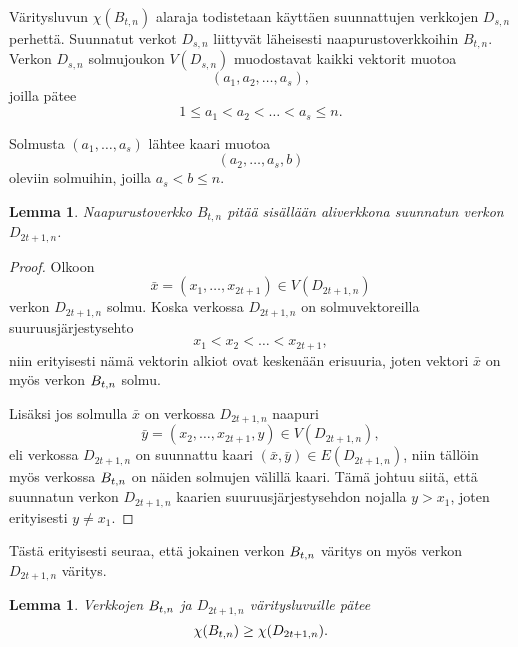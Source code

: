 \documentclass[finnish]{tktltiki2}
\newtheorem{lem}[lau]{Lemma}
\theoremstyle{definition}
\theoremstyle{remark}
\newcommand{\Dsn}{D_{s,n}}
\begin{document}
Väritysluvun $\chi(B_{t,n})$ alaraja todistetaan käyttäen suunnattujen
verkkojen $\Dsn$ perhettä. Suunnatut verkot $\Dsn$ liittyvät läheisesti
naapurustoverkkoihin $B_{t,n}$. Verkon $\Dsn$ solmujoukon $V(\Dsn)$ muodostavat
kaikki vektorit muotoa
%
\begin{equation*}
    (a_1,a_2,\dots,a_s),
\end{equation*}
%
joilla pätee
%
\begin{equation*}
    1 \leq a_1 < a_2 < \dots < a_s \leq n.
\end{equation*}

Solmusta $(a_1,\dots,a_s)$ lähtee kaari muotoa
%
\begin{equation*}
    (a_2,\dots,a_s,b)
\end{equation*}
%
oleviin solmuihin, joilla $a_s < b \leq n$.

\begin{lem}
    Naapurustoverkko $B_{t,n}$ pitää sisällään aliverkkona suunnatun verkon
    $D_{2t+1,n}$.
\end{lem}

\newcommand{\D}{D_{2t+1,n}}
\begin{proof}
    Olkoon
    \begin{equation*}
        \bar{x} = (x_1, \dots, x_{2t+1}) \in V(\D)
    \end{equation*}
    verkon $\D$ solmu.  Koska verkossa $\D$ on solmuvektoreilla
    suuruusjärjestysehto
    \begin{equation*}
        x_1 < x_2 < \dots < x_{2t+1},
    \end{equation*}
    niin erityisesti nämä vektorin alkiot ovat keskenään erisuuria, joten
    vektori $\bar{x}$ on myös verkon $B_{t,n}$ solmu.

    Lisäksi jos solmulla $\bar{x}$ on verkossa $\D$ naapuri
    \begin{equation*}
            \bar{y} = (x_2, \dots, x_{2t+1}, y) \in V(\D),
    \end{equation*}
    eli verkossa $\D$ on suunnattu kaari $(\bar{x},\bar{y}) \in E(\D)$, niin
    tällöin myös verkossa $B_{t,n}$ on näiden solmujen välillä kaari. Tämä
    johtuu siitä, että suunnatun verkon $\D$ kaarien suuruusjärjestysehdon
    nojalla $y > x_1$, joten erityisesti $y \neq x_1$.
\end{proof}

Tästä erityisesti seuraa, että jokainen verkon $B_{t,n}$ väritys on myös verkon
$\D$ väritys.

\begin{lem}
    Verkkojen $B_{t,n}$ ja $\D$ väritysluvuille pätee
    \begin{equation*}
        \chi(\Btn) \geq \chi(\D).
    \end{equation*}
\end{lem}
\end{document}
